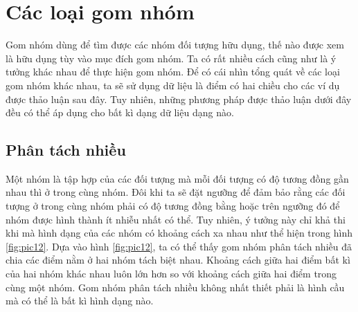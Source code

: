 \section{Các loại gom nhóm}
\label{sec:clgn}
Gom nhóm dùng để tìm được các nhóm đối tượng hữu dụng, thế nào được xem là hữu dụng tùy vào mục đích gom nhóm.
Ta có rất nhiều cách cũng như là ý tưởng khác nhau để thực hiện gom nhóm.
Để có cái nhìn tổng quát về các loại gom nhóm khác nhau, ta sẽ sử dụng dữ liệu là điểm có hai chiều cho các ví dụ được thảo luận sau đây.
Tuy nhiên, những phương pháp được thảo luận dưới đây đều có thể áp dụng cho bất kì dạng dữ liệu dạng nào.

\subsection{Phân tách nhiều}
Một nhóm là tập hợp của các đối tượng mà mỗi đối tượng có độ tương đồng gần nhau thì ở trong cùng nhóm.
Đôi khi ta sẽ đặt ngưỡng để đảm bảo rằng các đối tượng ở trong cùng nhóm phải có độ tương đồng bằng hoặc trên ngưỡng đó để nhóm được hình thành ít nhiễu nhất có thể.
Tuy nhiên, ý tưởng này chỉ khả thi khi mà hình dạng của các nhóm có khoảng cách xa nhau như thể hiện trong hình \ref{fig:pic12}.
Dựa vào hình \ref{fig:pic12}, ta có thể thấy gom nhóm phân tách nhiều đã chia các điểm nằm ở hai nhóm tách biệt nhau.
Khoảng cách giữa hai điểm bất kì của hai nhóm khác nhau luôn lớn hơn so với khoảng cách giữa hai điểm trong cùng một nhóm.
Gom nhóm phân tách nhiều không nhất thiết phải là hình cầu mà có thể là bất kì hình dạng nào.

